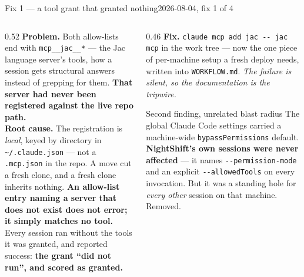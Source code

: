\documentclass[aspectratio=169,11pt]{beamer}
\newcommand{\good}[1]{\textcolor{jsAccent}{\textbf{#1}}}
\newcommand{\warn}[1]{\textcolor{jsWarm}{\textbf{#1}}}
\begin{document}
\begin{frame}{Fix 1 --- a tool grant that granted nothing}{2026-08-04, fix 1 of 4}
  \footnotesize
  \begin{columns}[T]
    \begin{column}{0.52\textwidth}
      \textbf{Problem.} Both allow-lists end with \texttt{mcp\_\_jac\_\_*} --- the Jac language server's tools, how a session gets structural answers instead of grepping for them. \textbf{That server had never been registered against the live repo path.}
      \vspace{0.5em}\\
      \textbf{Root cause.} The registration is \emph{local}, keyed by directory in \texttt{\textasciitilde/.claude.json} --- not a \texttt{.mcp.json} in the repo. A move cut a fresh clone, and a fresh clone inherits nothing. \warn{An allow-list entry naming a server that does not exist does not error; it simply matches no tool.}
      \vspace{0.5em}\\
      Every session ran without the tools it was granted, and reported success: \textbf{the grant ``did not run'', and scored as granted.}
    \end{column}
    \begin{column}{0.46\textwidth}
      \textbf{Fix.} \texttt{claude mcp add jac -{}- jac mcp} in the work tree --- now the one piece of per-machine setup a fresh deploy needs, written into \texttt{WORKFLOW.md}. \emph{The failure is silent, so the documentation is the tripwire.}
      \vspace{0.5em}
      \begin{block}{Second finding, unrelated blast radius}
        \scriptsize
        The global Claude Code settings carried a machine-wide \texttt{bypassPermissions} default. \good{NightShift's own sessions were never affected} --- it names \texttt{-{}-permission-mode} and an explicit \texttt{-{}-allowedTools} on every invocation. But it was a standing hole for \emph{every other} session on that machine. Removed.
      \end{block}
    \end{column}
  \end{columns}
\end{frame}
\end{document}
